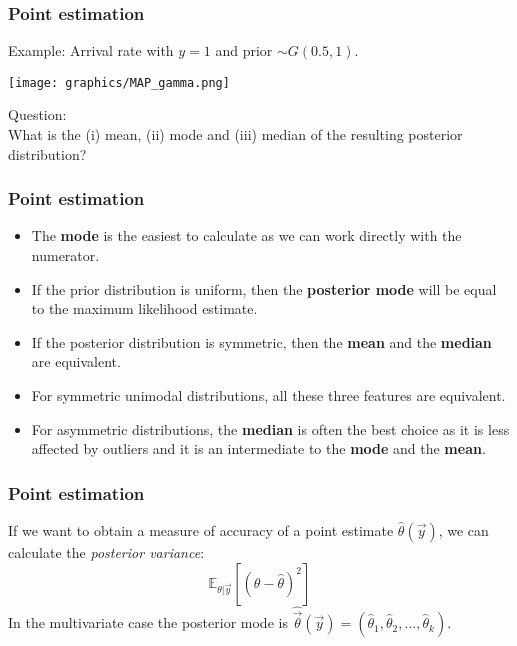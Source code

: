 \documentclass{beamer}
\newcommand{\E}{\mathbb{E}}
\newcommand{\1}{\ensuremath{\mathbf{1}}}
\begin{document}
%
%
%
\begin{frame}\frametitle{Point estimation}
	Example: Arrival rate with $y = 1$ and prior $\sim G (0.5, 1)$.
	\begin{center}
		\texttt{[image: graphics/MAP\_gamma.png]}
	\end{center}
	Question:\\
	What is the (i) mean, (ii) mode and (iii) median of the resulting posterior distribution?
\end{frame}
%
%
%
\begin{frame}\frametitle{Point estimation}
	\begin{itemize}
		\item The \textbf{mode} is the easiest to calculate as we can work directly with the numerator.
		\item If the prior distribution is uniform, then the \textbf{posterior mode} will be equal to the maximum likelihood estimate.
		\item If the posterior distribution is symmetric, then the \textbf{mean} and the \textbf{median} are equivalent.
		\item For symmetric unimodal distributions, all these three features are equivalent.
		\item For asymmetric distributions, the \textbf{median} is often the best choice as it is less affected by outliers and it is an intermediate to the \textbf{mode} and the \textbf{mean}.
	\end{itemize}
\end{frame}
%
%
%
\begin{frame}\frametitle{Point estimation}
	If we want to obtain a measure of accuracy of a point estimate $\hat\theta(\vec{y})$, we can calculate the \emph{posterior variance}:
	\begin{equation}
		\E_{\theta|\vec{y}}[(\theta-\hat\theta)^2]
	\end{equation}
	In the multivariate case the posterior mode is $\hat{\vec{\theta}}(\vec{y}) = (\hat\theta_1,\hat\theta_2,...,\hat\theta_k)$.
\end{frame}
\end{document}
